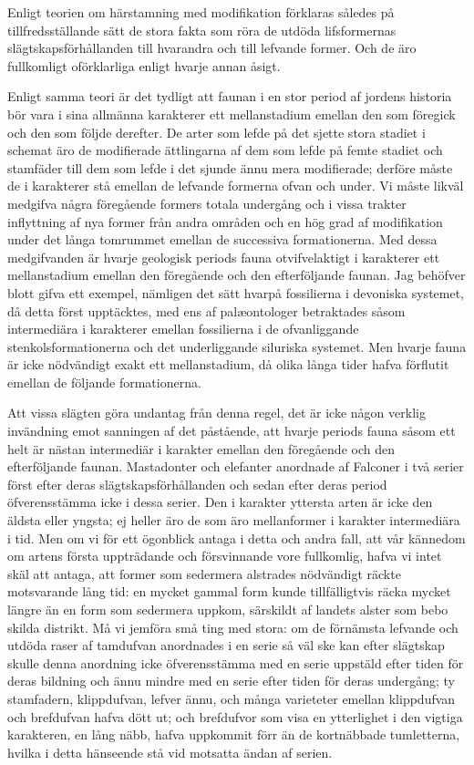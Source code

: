 Enligt teorien om härstamning med modifikation förklaras således på tillfredsställande sätt de stora fakta som röra de utdöda lifsformernas slägtskapsförhållanden till hvarandra och till lefvande former. Och de äro fullkomligt oförklarliga enligt hvarje annan åsigt.

Enligt samma teori är det tydligt att faunan i en stor period af jordens historia bör vara i sina allmänna karakterer ett mellanstadium emellan den som föregick och den som följde derefter. De arter som lefde på det sjette stora stadiet i schemat äro de modifierade ättlingarna af dem som lefde på femte stadiet och stamfäder till dem som lefde i det sjunde ännu mera modifierade; derföre måste de i karakterer stå emellan de lefvande formerna ofvan och under. Vi måste likväl medgifva några föregående formers totala undergång och i vissa trakter inflyttning af nya former från andra områden och en hög grad af modifikation under det långa tomrummet emellan de successiva formationerna. Med dessa medgifvanden är hvarje geologisk periods fauna otvifvelaktigt i karakterer ett mellanstadium emellan den föregående och den efterföljande faunan. Jag behöfver blott gifva ett exempel, nämligen det sätt hvarpå fossilierna i devoniska systemet, då detta först upptäcktes, med ens af palæontologer betraktades såsom intermediära i karakterer emellan fossilierna i de ofvanliggande stenkolsformationerna och det underliggande siluriska systemet. Men hvarje fauna är icke nödvändigt exakt ett mellanstadium, då olika långa tider hafva förflutit emellan de följande formationerna.

Att vissa slägten göra undantag från denna regel, det är icke någon verklig invändning emot sanningen af det påstående, att hvarje periods fauna såsom ett helt är nästan intermediär i karakter emellan den föregående och den efterföljande faunan. Mastadonter och elefanter anordnade af Falconer i två serier först efter deras slägtskapsförhållanden och sedan efter deras period öfverensstämma icke i dessa serier. Den i karakter yttersta arten är icke den äldsta eller yngsta; ej heller äro de som äro mellanformer i karakter intermediära i tid. Men om vi för ett ögonblick antaga i detta och andra fall, att vår kännedom om artens första uppträdande och försvinnande vore fullkomlig, hafva vi intet skäl att antaga, att former som sedermera alstrades nödvändigt räckte motsvarande lång tid: en mycket gammal form kunde tillfälligtvis räcka mycket längre än en form som sedermera uppkom, särskildt af landets alster som bebo skilda distrikt. Må vi jemföra små ting med stora: om de förnämsta lefvande och utdöda raser af tamdufvan anordnades i en serie så väl ske kan efter slägtskap skulle denna anordning icke öfverensstämma med en serie uppstäld efter tiden för deras bildning och ännu mindre med en serie efter tiden för deras undergång; ty stamfadern, klippdufvan, lefver ännu, och många varieteter emellan klippdufvan och brefdufvan hafva dött ut; och brefdufvor som visa en ytterlighet i den vigtiga karakteren, en lång näbb, hafva uppkommit förr än de kortnäbbade tumletterna, hvilka i detta hänseende stå vid motsatta ändan af serien.

